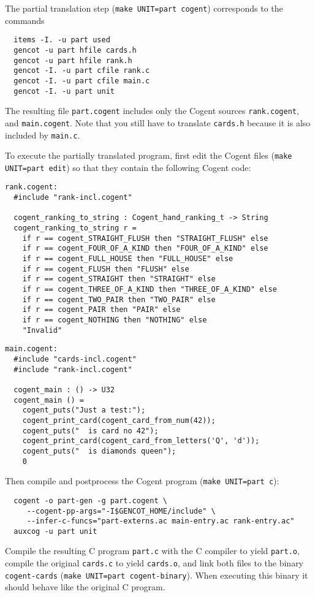 \documentclass[a4paper]{report}
\newcommand{\code}[1]{\textnormal{\texttt{#1}}}
\begin{document}
The partial translation step (\code{make UNIT=part cogent}) corresponds to the commands
\begin{verbatim}
  items -I. -u part used
  gencot -u part hfile cards.h
  gencot -u part hfile rank.h
  gencot -I. -u part cfile rank.c
  gencot -I. -u part cfile main.c
  gencot -I. -u part unit
\end{verbatim}
The resulting file \code{part.cogent} includes only the Cogent sources \code{rank.cogent}, and
\code{main.cogent}. Note that you still have to translate \code{cards.h} because it is also included by \code{main.c}.

To execute the partially translated program, first edit the Cogent files (\code{make UNIT=part edit}) so that they contain
the following Cogent code:
\begin{verbatim}
rank.cogent:
  #include "rank-incl.cogent"

  cogent_ranking_to_string : Cogent_hand_ranking_t -> String
  cogent_ranking_to_string r =
    if r == cogent_STRAIGHT_FLUSH then "STRAIGHT_FLUSH" else
    if r == cogent_FOUR_OF_A_KIND then "FOUR_OF_A_KIND" else
    if r == cogent_FULL_HOUSE then "FULL_HOUSE" else
    if r == cogent_FLUSH then "FLUSH" else
    if r == cogent_STRAIGHT then "STRAIGHT" else
    if r == cogent_THREE_OF_A_KIND then "THREE_OF_A_KIND" else
    if r == cogent_TWO_PAIR then "TWO_PAIR" else
    if r == cogent_PAIR then "PAIR" else
    if r == cogent_NOTHING then "NOTHING" else
    "Invalid"
\end{verbatim}

\begin{verbatim}
main.cogent:
  #include "cards-incl.cogent"
  #include "rank-incl.cogent"

  cogent_main : () -> U32
  cogent_main () =
    cogent_puts("Just a test:");
    cogent_print_card(cogent_card_from_num(42));
    cogent_puts("  is card no 42");
    cogent_print_card(cogent_card_from_letters('Q', 'd'));
    cogent_puts("  is diamonds queen");
    0
\end{verbatim}

Then compile and postprocess the Cogent program (\code{make UNIT=part c}):
\begin{verbatim}
  cogent -o part-gen -g part.cogent \
     --cogent-pp-args="-I$GENCOT_HOME/include" \
     --infer-c-funcs="part-externs.ac main-entry.ac rank-entry.ac"
  auxcog -u part unit
\end{verbatim}

Compile the resulting C program \code{part.c} with the C compiler to yield \code{part.o},
compile the original \code{cards.c} to yield \code{cards.o}, and link both files to the binary
\code{cogent-cards} (\code{make UNIT=part cogent-binary}). When executing this binary it should
behave like the original C program.
\end{document}
